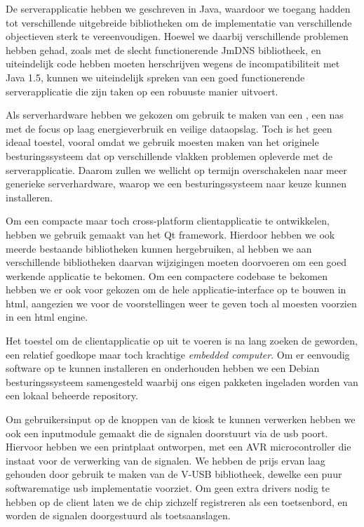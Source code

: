 De serverapplicatie hebben we geschreven in Java, waardoor we toegang hadden tot verschillende uitgebreide bibliotheken om de implementatie van verschillende objectieven sterk te vereenvoudigen. Hoewel we daarbij verschillende problemen hebben gehad, zoals met de slecht functionerende JmDNS bibliotheek, en uiteindelijk code hebben moeten herschrijven wegens de incompatibiliteit met Java 1.5, kunnen we uiteindelijk spreken van een goed functionerende serverapplicatie die zijn taken op een robuuste manier uitvoert.

Als serverhardware hebben we gekozen om gebruik te maken van een , een \ac{nas} met de focus op laag energieverbruik en veilige dataopslag. Toch is het geen ideaal toestel, vooral omdat we gebruik moesten maken van het originele besturingssysteem dat op verschillende vlakken problemen opleverde met de serverapplicatie. Daarom zullen we wellicht op termijn overschakelen naar meer generieke serverhardware, waarop we een besturingssysteem naar keuze kunnen installeren.

Om een compacte maar toch cross-platform clientapplicatie te ontwikkelen, hebben we gebruik gemaakt van het Qt framework. Hierdoor hebben we ook meerde bestaande bibliotheken kunnen hergebruiken, al hebben we aan verschillende bibliotheken daarvan wijzigingen moeten doorvoeren om een goed werkende applicatie te bekomen. Om een compactere codebase te bekomen hebben we er ook voor gekozen om de hele applicatie-interface op te bouwen in \ac{html}, aangezien we voor de voorstellingen weer te geven toch al moesten voorzien in een \ac{html} engine.

Het toestel om de clientapplicatie op uit te voeren is na lang zoeken de  geworden, een relatief goedkope maar toch krachtige \emph{embedded computer}. Om er eenvoudig software op te kunnen installeren en onderhouden hebben we een Debian besturingssysteem samengesteld waarbij ons eigen pakketen ingeladen worden van een lokaal beheerde repository.

Om gebruikersinput op de knoppen van de kiosk te kunnen verwerken hebben we ook een inputmodule gemaakt die de signalen doorstuurt via de \ac{usb} poort. Hiervoor hebben we een printplaat ontworpen, met een AVR microcontroller die instaat voor de verwerking van de signalen. We hebben de prijs ervan laag gehouden door gebruik te maken van de V-USB bibliotheek, dewelke een puur softwarematige \ac{usb} implementatie voorziet. Om geen extra drivers nodig te hebben op de client laten we de chip zichzelf registreren als een toetsenbord, en worden de signalen doorgestuurd als toetsaanslagen.

